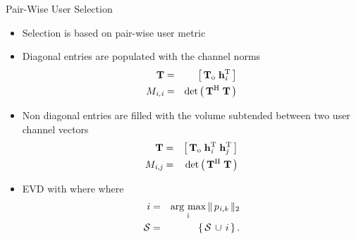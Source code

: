\documentclass{beamer}
\begin{document}
\begin{frame}
\begin{block}{Pair-Wise User Selection}
\begin{itemize}
  \item Selection is based on pair-wise user metric
  \item Diagonal entries are populated with the channel norms
  \begin{eqnarray*}
  \mathbf{T} &=& \left [\,\mathbf{T}_{\mathrm{o}} \; \mathbf{h}_{\mathit{i}}^{\mathrm{T}} \, \right ] \\
  {M}_{\mathit{i},\mathit{i}} &=& \det{\left ( \, \mathbf{T}^{\mathrm{H}} \; \mathbf{T} \, \right )}
  \end{eqnarray*}
  \item Non diagonal entries are filled with the volume subtended between two user channel vectors
  \begin{eqnarray*}
  \mathbf{T} &=& \left [\,\mathbf{T}_{\mathrm{o}} \; \mathbf{h}_{\mathit{i}}^{\mathrm{T}} \; \mathbf{h}_{\mathit{j}}^{\mathrm{T}} \, \right ] \\
  {M}_{\mathit{i},\mathit{j}} &=& \det{\left ( \, \mathbf{T}^{\mathrm{H}} \; \mathbf{T} \, \right )}
  \end{eqnarray*}
  \item EVD with  where  where  \cite{saaty2008decision}
  \begin{eqnarray*}
  i &=& \operatorname*{\arg\,max}_{\mathrm{i}} \|\, {p}_{\mathit{i},\mathit{k}} \,\|_{2} \\
  \mathcal{S} &=& \left \lbrace \, \mathcal{S} \, \cup \, i \, \right \rbrace.
  \end{eqnarray*}
\end{itemize}
\end{block}
\end{frame}
\end{document}
